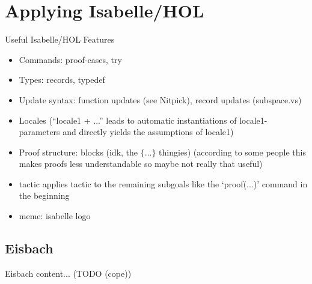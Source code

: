 \documentclass[en,navbaroff]{afvbeamer}
\begin{document}
	\section{Applying Isabelle/HOL}

	\begin{frame}{Useful Isabelle/HOL Features}
		\begin{itemize}
			\item Commands: proof-cases, try
			\item Types: records, typedef
			\item Update syntax: function updates (see Nitpick), record updates (subspace.vs)
			\item Locales (\enquote{locale1 + ...} leads to automatic instantiations of locale1-parameters and directly yields the assumptions of locale1)
			\item Proof structure: blocks (idk, the $\{...\}$ thingies) (according to some people this makes proofs less understandable so maybe not really that useful)
			\item <subgoal-proof> tactic applies tactic to the remaining subgoals like the \enquote*{proof(...)} command in the beginning
			\item meme: isabelle logo
		\end{itemize}
	\end{frame}
	
	\subsection{Eisbach}
	\begin{frame}{Eisbach}
		content... (TODO (cope))
	\end{frame}
	
\end{document}
